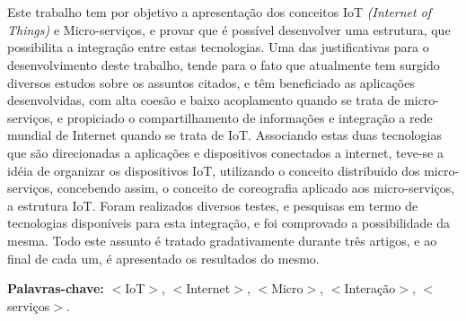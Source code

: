 \section*{}

Este trabalho tem por objetivo a apresentação dos conceitos IoT \emph{(Internet of Things)} e Micro-serviços, e provar que é possível desenvolver uma estrutura, que possibilita a integração entre estas tecnologias. Uma das justificativas para o desenvolvimento deste trabalho, tende para o fato que atualmente tem surgido diversos estudos sobre os assuntos citados, e têm beneficiado as aplicações desenvolvidas, com alta coesão e baixo acoplamento quando se trata de micro-serviços, e propiciado o compartilhamento de informações e integração a rede mundial de Internet quando se trata de IoT. Associando estas duas tecnologias que são direcionadas a aplicações e dispositivos conectados a internet, teve-se a idéia de organizar os dispositivos IoT, utilizando o conceito distribuido dos micro-serviços, concebendo assim, o conceito de coreografia aplicado aos micro-serviços, a estrutura IoT. Foram realizados diversos testes, e pesquisas em termo de tecnologias disponíveis para esta integração, e foi comprovado a possibilidade da mesma. Todo este assunto é tratado gradativamente durante três artigos, e ao final de cada um, é apresentado os resultados do mesmo.

{\bf Palavras-chave:} $<$IoT$>$,  $<$Internet$>$, $<$Micro$>$, $<$Interação$>$, $<$serviços$>$.